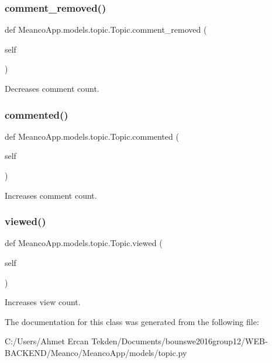\subsubsection{\texorpdfstring{comment\+\_\+removed()}{comment\_removed()}}
{\footnotesize\ttfamily def Meanco\+App.\+models.\+topic.\+Topic.\+comment\+\_\+removed (\begin{DoxyParamCaption}\item[{}]{self }\end{DoxyParamCaption})}



Decreases comment count. 

\hypertarget{class_meanco_app_1_1models_1_1topic_1_1_topic_a9296294fed15990472ff572be0be6d4b}{}\label{class_meanco_app_1_1models_1_1topic_1_1_topic_a9296294fed15990472ff572be0be6d4b} 
\subsubsection{\texorpdfstring{commented()}{commented()}}
{\footnotesize\ttfamily def Meanco\+App.\+models.\+topic.\+Topic.\+commented (\begin{DoxyParamCaption}\item[{}]{self }\end{DoxyParamCaption})}



Increases comment count. 

\hypertarget{class_meanco_app_1_1models_1_1topic_1_1_topic_a436224fa3327f5cb0436638585aff487}{}\label{class_meanco_app_1_1models_1_1topic_1_1_topic_a436224fa3327f5cb0436638585aff487} 
\subsubsection{\texorpdfstring{viewed()}{viewed()}}
{\footnotesize\ttfamily def Meanco\+App.\+models.\+topic.\+Topic.\+viewed (\begin{DoxyParamCaption}\item[{}]{self }\end{DoxyParamCaption})}



Increases view count. 



The documentation for this class was generated from the following file\+:\begin{DoxyCompactItemize}
\item 
C\+:/\+Users/\+Ahmet Ercan Tekden/\+Documents/bounswe2016group12/\+W\+E\+B-\/\+B\+A\+C\+K\+E\+N\+D/\+Meanco/\+Meanco\+App/models/topic.\+py\end{DoxyCompactItemize}
